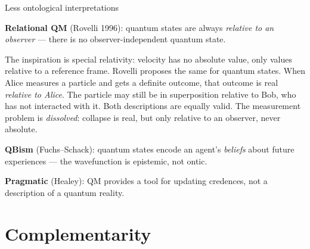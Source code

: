\documentclass[fleql]{beamer}
\begin{document}
\begin{frame}{Less ontological interpretations}

  \textbf{Relational QM} (Rovelli 1996): quantum states are always
  \emph{relative to an observer} --- there is no
  observer-independent quantum state.

  \vspace{0.3em}
  \small The inspiration is special relativity: velocity has no
  absolute value, only values relative to a reference frame.
  Rovelli proposes the same for quantum states. When Alice measures
  a particle and gets a definite outcome, that outcome is real
  \emph{relative to Alice}. The particle may still be in
  superposition relative to Bob, who has not interacted with it.
  Both descriptions are equally valid. The measurement problem is
  \emph{dissolved}: collapse is real, but only relative to an
  observer, never absolute.

  \vspace{0.4em}
  \normalsize \textbf{QBism} (Fuchs--Schack): quantum states encode
  an agent's \emph{beliefs} about future experiences --- the
  wavefunction is epistemic, not ontic.

  \vspace{0.3em}
  \textbf{Pragmatic} (Healey): QM provides a tool for updating
  credences, not a description of a quantum reality.

\end{frame}

\section{Complementarity}
\end{document}
